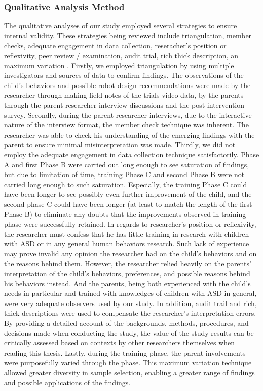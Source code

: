 \subsubsection{Qualitative Analysis Method}
The qualitative analyses of our study employed several strategies to ensure internal validity.  These strategies being reviewed include triangulation, member checks, adequate engagement in data collection, reseracher's position or reflexivity, peer review / examination, audit trial, rich thick description, an maximum variation \cite{merriam2014qualitative}.  Firstly, we employed triangulation by using multiple investigators and sources of data to confirm findings.  The observations of the child's behaviors and possible robot design recommendations were made by the researcher through making field notes of the trials video data, by the parents through the parent researcher interview discussions and the post intervention survey.  Secondly, during the parent researcher interviews, due to the interactive nature of the interview format, the member check technique was inherent.  The researcher was able to check his understanding of the emerging findings with the parent to ensure minimal misinterpretation was made.  Thirdly, we did not employ the adequate engagement in data collection technique satisfactorily.  Phase A and first Phase B were carried out long enough to see saturation of findings, but due to limitation of time, training Phase C and second Phase B were not carried long enough to such saturation.  Especially, the training Phase C could have been longer to see possibly even further improvement of the child, and the second phase C could have been longer (at least to match the length of the first Phase B) to eliminate any doubts that the improvements observed in training phase were successfully retained.  In regards to researcher's position or reflexivity, the researcher must confess that he has little training in research with children with ASD or in any general human behaviors research.  Such lack of experience may prove invalid any opinion the researcher had on the child's behaviors and on the reasons behind them.  However, the researcher relied heavily on the parents' interpretation of the child's behaviors, preferences, and possible reasons behind his behaviors instead.  And the parents, being both experienced with the child's needs in particular and trained with knowledges of children with ASD in general, were very adequate observers used by our study.  In addition, audit trail and rich, thick descriptions were used to compensate the researcher's interpretation errors.  By providing a detailed account of the backgrounds, methods, procedures, and decisions made when conducting the study, the value of the study results can be critically assessed based on contexts by other researchers themselves when reading this thesis.  Lastly, during the training phase, the parent involvements were purposefully varied through the phase.  This maximum variation technique allowed greater diversity in sample selection, enabling a greater range of findings and possible applications of the findings.

